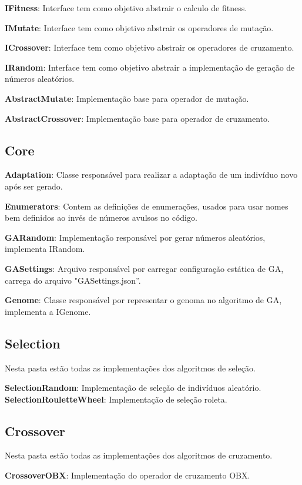 \textbf{IFitness}: Interface tem como objetivo abstrair o calculo de fitness.

\textbf{IMutate}: Interface tem como objetivo abstrair os operadores de mutação.

\textbf{ICrossover}:  Interface tem como objetivo abstrair os operadores de cruzamento.

\textbf{IRandom}: Interface tem como objetivo abstrair a implementação de geração de números aleatórios.

\textbf{AbstractMutate}: Implementação base para operador de mutação.

\textbf{AbstractCrossover}: Implementação base para operador de cruzamento.

\subsection{Core}

\textbf{Adaptation}: Classe responsável para realizar a adaptação de um indivíduo novo após ser gerado.

\textbf{Enumerators}: Contem as definições de enumerações, usados para usar nomes bem definidos ao invés de números avulsos no código.

\textbf{GARandom}: Implementação responsável por gerar números aleatórios, implementa IRandom.

\textbf{GASettings}: Arquivo responsável por carregar configuração estática de GA, carrega do arquivo "GASettings.json”.

\textbf{Genome}: Classe responsável por representar o genoma no algoritmo de GA, implementa a IGenome.


\subsection{Selection}

Nesta pasta estão todas as implementações dos algoritmos de seleção.

\textbf{SelectionRandom}: Implementação de seleção de indivíduos aleatório.
\textbf{SelectionRouletteWheel}: Implementação de seleção roleta.

\subsection{Crossover}

Nesta pasta estão todas as implementações dos algoritmos de cruzamento.

\textbf{CrossoverOBX}: Implementação do operador de cruzamento OBX.

